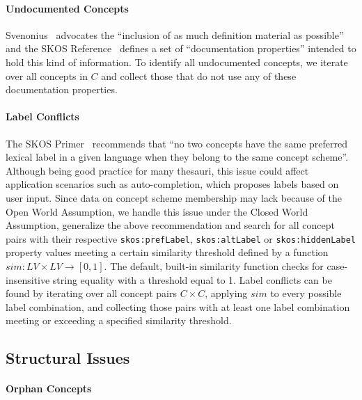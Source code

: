 \paragraph{Undocumented Concepts}

Svenonius~\cite{Svenonius1997} advocates the ``inclusion of as much definition material as possible'' and the SKOS Reference~\cite{SkosReference2008} defines a set of ``documentation properties'' intended to hold this kind of information.
To identify all undocumented concepts, we iterate over all concepts in $C$ and collect those that do not use any of these documentation properties.

\paragraph{Label Conflicts}

The SKOS Primer~\cite{Isaac2009} recommends that ``no two concepts have the same preferred lexical label in a given language when they belong to the same concept scheme''. Although being good practice for many thesauri, this issue could affect application scenarios such as auto-completion, which proposes labels based on user input.
Since data on concept scheme membership may lack because of the Open World Assumption, we handle this issue under the Closed World Assumption, generalize the above recommendation and search for all concept pairs with their respective \texttt{skos:prefLabel}, \texttt{skos:altLabel} or \texttt{skos:hiddenLabel} property values meeting a certain similarity threshold defined by a function $sim:LV \times LV \rightarrow [0,1]$. The default, built-in similarity function checks for case-insensitive string equality with a threshold equal to 1. Label conflicts can be found by iterating over all concept pairs $C \times C$, applying $sim$ to every possible label combination, and collecting those pairs with at least one label combination meeting or exceeding a specified similarity threshold.


\subsection{Structural Issues}

\paragraph{Orphan Concepts}

